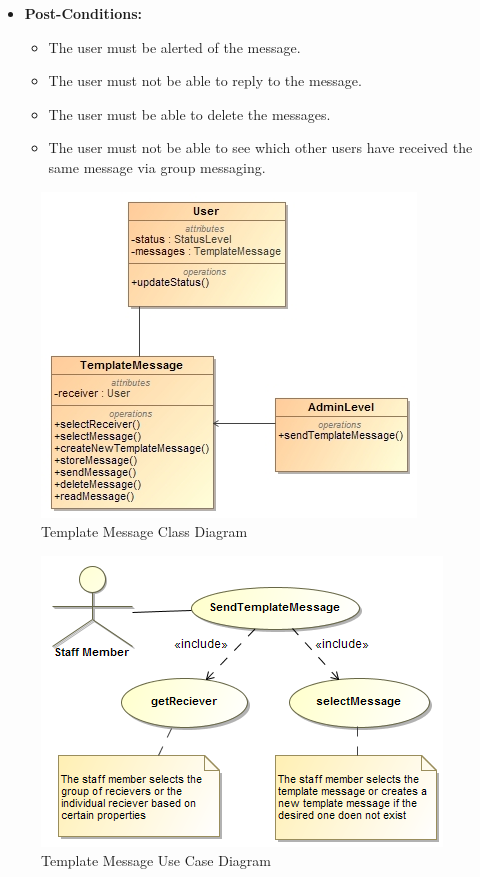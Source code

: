 \documentclass[11pt]{article}
\begin{document}
\begin{enumerate}
\begin{itemize}
\begin{itemize}
	\end{itemize}

\item\textbf{Post-Conditions: }
	\begin{itemize}
		\item The user must be alerted of the message.
		\item The user must not be able to reply to the message.
		\item The user must be able to delete the messages.
		\item The user must not be able to see which other users have received the same message via group messaging.
	\end{itemize}
\end{itemize}
\graphicspath{ {../Diagrams/Maret/class/} }
	\begin{figure}[H]	
    	\includegraphics[scale=0.5]{TemplateMessages.jpg}
    	\caption{Template Message Class Diagram}
	\end{figure}
\graphicspath{ {../Diagrams/Maret/usecase/} }	
	\begin{figure}[H]	
    	\includegraphics[scale=0.5]{TemplateMessage.png}
    	\caption{Template Message Use Case Diagram}
	\end{figure}
	

\end{enumerate}
\end{document}
